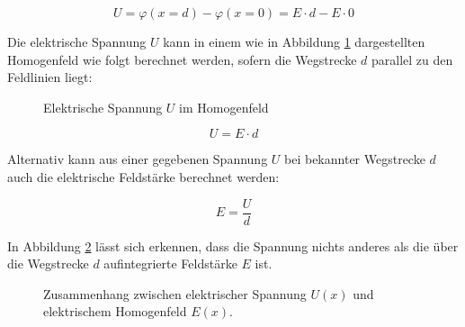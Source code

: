 \begin{frame}
{	 \begin{equation*}
		 U = \varphi(x= d) - \varphi(x= 0) = E \cdot d - E \cdot 0
	 \end{equation*}

	Die elektrische Spannung $U$ kann in einem wie in Abbildung \ref{fig:spannunghomogen} dargestellten Homogenfeld wie folgt berechnet werden,
	  sofern die Wegstrecke $d$ parallel zu den Feldlinien liegt:

	 
	  \begin{figure}[ht]
		\centering
		\caption{Elektrische Spannung $U$ im Homogenfeld}
		\label{fig:spannunghomogen}
	\end{figure}

	 



	\begin{equation}
	 U = E \cdot d
	\end{equation}

	
	Alternativ kann aus einer gegebenen Spannung $U$ bei bekannter Wegstrecke $d$ auch die elektrische Feldstärke berechnet werden:
	
	\begin{equation}
		E = \frac{U}{d}
	   \end{equation}

	In Abbildung \ref{fig:spannunggraph} lässt sich erkennen, dass die Spannung nichts anderes als die über die Wegstrecke $d$ aufintegrierte Feldstärke $E$ ist.
	

	\begin{figure}[ht]
		\centering
		\caption{Zusammenhang zwischen elektrischer Spannung $U(x)$ und elektrischem Homogenfeld $E(x)$.}
		\label{fig:spannunggraph}

	\end{figure}



}
\end{frame}
